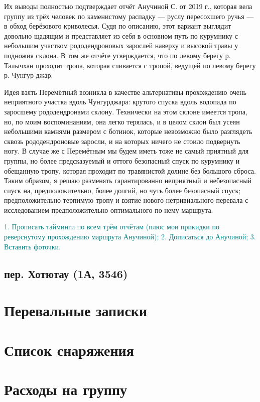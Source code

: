 \documentclass[a4paper, 12pt]{report}
\begin{document}
Их выводы полностью подтверждает отчёт Анучиной С. от 2019 г., которая вела группу из трёх человек по каменистому распадку --- руслу пересохшего ручья --- в обход берёзового криволесья. Судя по описанию, этот вариант выглядит довольно щадящим и представляет из себя в основном путь по курумнику с небольшим участком рододендроновых зарослей наверху и высокой травы у подножия склона. В том же отчёте утверждается, что по левому берегу р. Талычхан проходит тропа, которая сливается с тропой, ведущей по левому берегу р. Чунгур-джар. 

Идея взять Перемётный возникла в качестве альтернативы прохождению очень неприятного участка вдоль Чунгурджара: крутого спуска вдоль водопада по заросшему рододендронами склону. Технически на этом склоне имеется тропа, но, по моим воспоминаниям, она легко терялась, и в целом склон был усеян небольшими камнями размером с ботинок, которые невозможно было разглядеть сквозь рододендроновые заросли, и на которых ничего не стоило подвернуть ногу. В случае же с Перемётным мы будем иметь тоже не самый приятный для группы, но более предсказуемый и оттого безопасный спуск по курумнику и обещанную тропу, которая проходит по травянистой долине без большого сброса. Таким образом, я решаю разменять гарантированно неприятный и небезопасный спуск на, предположительно, более долгий, но чуть более безопасный спуск; предположительно терпимую тропу и взятие нового нетривиального перевала с исследованием предположительно оптимального по нему маршрута.

\textcolor{teal}{1. Прописать тайминги по всем трём отчётам (плюс мои прикидки по реверснутому прохождению маршрута Анучиной); 2. Дописаться до Анучиной; 3. Вставить фоточки.}

\subsection{пер. Хотютау (1А, 3546)} 

\appendix
\section{Перевальные записки}
\section{Список снаряжения}
\section{Расходы на группу}



\end{document}
